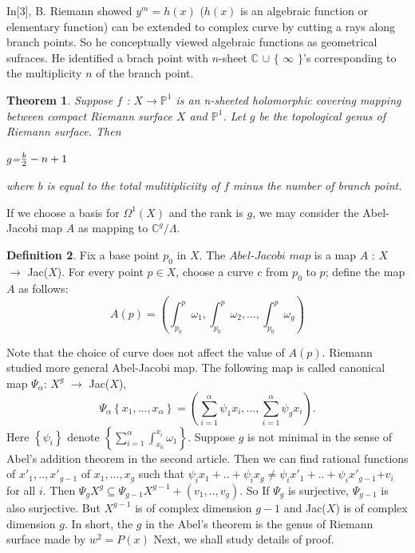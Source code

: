 \documentclass[11pt]{amsart}
\newtheorem{thm}{Theorem}[section]
\theoremstyle{definition}
\newtheorem{defn}[thm]{Definition}
\begin{document}
\vspace{2ex}
In[3], B. Riemann showed $y^{m}=h(x)$ ($h(x)$ is an algebraic function or elementary function) can be extended to complex curve by cutting a rays along  branch points. So he conceptually viewed algebraic functions as geometrical sufraces. He identified a brach point with $n$-sheet $\mathbb{C}$ $\cup$ $\{$ $\infty$ $\}$'s corresponding to the multiplicity $n$ of the branch point.

\begin{thm}
Suppose $f$ : $X \to \mathbb{P}^{1}$ is an n-sheeted holomorphic covering mapping between compact Riemann surface $X$ and $\mathbb{P}^{1}$. Let $g$ be the topological genus of Riemann surface. Then 

\begin{center}
$g$=${b \over 2}-n+1$
\end{center} where $b$ is equal to the total mulitipliciity of $f$ minus the number of branch point.
\end{thm}
If we choose a basis for $\Omega^{1}(X)$ and the rank is $g$, we may consider the Abel-Jacobi map $A$ as mapping to $\mathbb{C}^{g}/\Lambda$.
\begin{defn}
 Fix a base point $p_0$ in $X$. The $Abel$-$Jacobi$ $map$ is a map $A$ : $X$ $\to$ Jac($X$). For every point $p \in X$, choose a curve $c$ from $p_0$ to $p$; define the map $A$ as follows:
\begin{equation*}
A(p) = \left(\int_{p_0}^{p} \omega_1, \int_{p_0}^{p} \omega_2,..., \int_{p_0}^p \omega_g \right) 
\end{equation*}
\end{defn}
Note that the choice of curve does not affect the value of $A(p)$. Riemann studied more general Abel-Jacobi map. The following map is called canonical map  $\Psi_\alpha$: $X^{g}$ $\to$ Jac($X$), 
\begin{equation*}
\Psi_\alpha \left\{ x_1,...,x_\alpha \right\} = \left( \sum_{i=1}^{\alpha} \psi_1 x_i, ... , \sum_{i=1}^{\alpha} \psi_{g} x_i \right).
\end{equation*}
\indent Here $\left\{ \psi_i \right\}$ denote $\left\{ \sum_{i=1}^{\alpha} \int_{x_0}^{x_i} \omega_1 \right\}$. 
Suppose $g$ is not minimal in the sense of Abel's addition theorem in the second article. Then we can find rational functions of $x'_1,..,x'_{g-1}$ of $x_1,...,x_g$ such that $\psi_i x_1+..+\psi_i x_g \ne \psi_i x'_1+..+\psi_i x'_{g-1}$+$v_i$ for all $i$.
Then $\Psi_{g} X^{g} \subseteq \Psi_{g-1} X^{g-1} + ( v_1,..,v_{g} ) $. So If $\Psi_{g}$ is surjective, $\Psi_{g-1}$ is also surjective. But $X^{g-1}$ is of complex dimension $g-1$ and Jac($X$) is of complex dimension $g$. In short, the $g$ in the Abel's theorem is the genus of Riemann surface made by $w^{2}=P(x)$
Next, we shall study details of proof.
\end{document}
